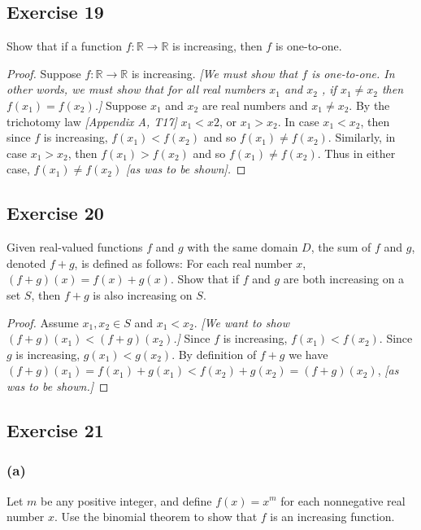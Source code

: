 \documentclass[14pt]{extarticle}
\newcommand{\R}{\mathbb{R}}
\begin{document}
\subsection{Exercise 19}
Show that if a function \(f: \R \to \R\) is increasing, then \(f\) is one-to-one.

\begin{proof}
Suppose \(f: \R \to \R\) is increasing. {\it [We must show that \(f\) is one-to-one. In other words, we must show that 
for all real numbers \(x_1\) and \(x_2\) , if \(x_1 \neq x_2\) then \(f(x_1) = f(x_2)\).]} Suppose \(x_1\) and \(x_2\) are 
real numbers and \(x_1 \neq x_2\). By the trichotomy law {\it [Appendix A, T17]} \(x_1 < x2\), or \(x_1 > x_2\). In case 
\(x_1 < x_2\), then since \(f\) is increasing, \(f(x_1) < f(x_2)\) and so \(f(x_1) \neq f(x_2)\). Similarly, in case 
\(x_1 > x_2\), then \(f(x_1) > f(x_2)\) and so \(f(x_1)\neq f(x_2)\). Thus in either case, \(f(x_1) \neq f(x_2)\) 
{\it [as was to be shown].}
\end{proof}

\subsection{Exercise 20}
Given real-valued functions \(f\) and \(g\) with the same domain \(D\), the sum of \(f\) and \(g\), denoted \(f + g\), 
is defined as follows: For each real number \(x\), \((f + g)(x) = f(x) + g(x)\). Show that if \(f\) and \(g\) are both 
increasing on a set \(S\), then \(f + g\) is also increasing on \(S\).

\begin{proof}
Assume \(x_1, x_2 \in S\) and \(x_1 < x_2\). {\it [We want to show \((f+g)(x_1) < (f+g)(x_2)\).]} Since \(f\) is increasing,
\(f(x_1) < f(x_2)\). Since \(g\) is increasing, \(g(x_1) < g(x_2)\). By definition of \(f+g\) we have \((f+g)(x_1) = 
f(x_1) + g(x_1) < f(x_2) + g(x_2) = (f+g)(x_2)\), {\it [as was to be shown.]}
\end{proof}

\subsection{Exercise 21}
\subsubsection{(a)}
Let \(m\) be any positive integer, and define \(f(x) = x^m\) for each nonnegative real number \(x\). Use the binomial 
theorem to show that \(f\) is an increasing function.
\end{document}
